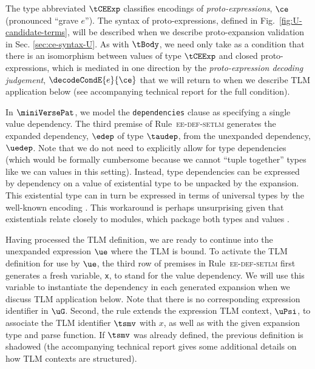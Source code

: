 \documentclass[acmsmall]{acmart}
\newcommand{\li}[1]{\lstinline[basicstyle=\ttfamily\fontsize{9pt}{1em}\selectfont]{#1}}
\newcommand{\lismall}[1]{\lstinline[basicstyle=\ttfamily\fontsize{9pt}{1em}\selectfont]{#1}}
\newcommand{\lifootnote}[1]{\lstinline[basicstyle=\ttfamily\fontsize{7pt}{1em}\selectfont]{#1}}
\begin{document}
The type abbreviated $\tCEExp$ classifies encodings of \emph{proto-expressions}, $\ce$ (pronounced ``grave $e$''). The syntax of proto-expressions, defined in Fig.~\ref{fig:U-candidate-terms}, will be described when we describe proto-expansion validation in Sec. \ref{sec:ce-syntax-U}. 
As with $\tBody$, we need only take as a condition that there is an isomorphism between values of type $\tCEExp$ and closed proto-expressions, which is mediated in one direction by the \emph{proto-expression decoding judgement}, $\decodeCondE{e}{\ce}$ that we will return to when we describe TLM application below (see accompanying technical report for the full condition).

In $\miniVersePat$, we model the \lismall{dependencies} clause as specifying a single value dependency.
The third premise of Rule~\textsc{ee-def-setlm} generates the expanded dependency, $\edep$ of type $\taudep$, from the unexpanded dependency, $\uedep$. Note that we do not need to explicitly allow for type dependencies (which would be formally cumbersome because we cannot ``tuple together'' types like we can values in this setting). Instead, type dependencies can be expressed by dependency on a value of existential type to be unpacked by the expansion. This existential type can in turn be expressed in terms of universal types by the well-known encoding \cite{B304,pfple1}. This workaround is perhaps unsurprising given that existentials relate closely to modules, which package both types and values \cite{pfple1,mitchell1988abstract}. 

Having processed the TLM definition, we are ready to continue into the unexpanded expression $\ue$ where the TLM is bound. To activate the TLM definition for use by $\ue$, the third row of premises in Rule~\textsc{ee-def-setlm} first generates a fresh variable, \li{x}, to stand for the value dependency. We will use this variable to instantiate the dependency in each generated expansion when we discuss TLM application below. Note that there is no corresponding expression identifier in $\uG$. Second, the rule extends the expression TLM context, $\uPsi$, to associate the TLM identifier $\tsmv$ with $x$, as well as with the given expansion type and parse function. If $\tsmv$ was already defined, the previous definition is shadowed (the accompanying technical report gives some additional details on how TLM contexts are structured).
\end{document}
